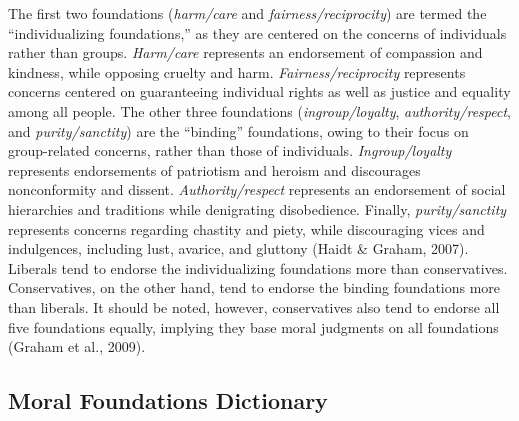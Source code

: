\documentclass[,man]{apa6}
\begin{document}
The first two foundations (\emph{harm/care} and
\emph{fairness/reciprocity}) are termed the \enquote{individualizing
foundations,} as they are centered on the concerns of individuals rather
than groups. \emph{Harm/care} represents an endorsement of compassion
and kindness, while opposing cruelty and harm.
\emph{Fairness/reciprocity} represents concerns centered on guaranteeing
individual rights as well as justice and equality among all people. The
other three foundations (\emph{ingroup/loyalty},
\emph{authority/respect}, and \emph{purity/sanctity}) are the
\enquote{binding} foundations, owing to their focus on group-related
concerns, rather than those of individuals. \emph{Ingroup/loyalty}
represents endorsements of patriotism and heroism and discourages
nonconformity and dissent. \emph{Authority/respect} represents an
endorsement of social hierarchies and traditions while denigrating
disobedience. Finally, \emph{purity/sanctity} represents concerns
regarding chastity and piety, while discouraging vices and indulgences,
including lust, avarice, and gluttony (Haidt \& Graham, 2007). Liberals
tend to endorse the individualizing foundations more than conservatives.
Conservatives, on the other hand, tend to endorse the binding
foundations more than liberals. It should be noted, however,
conservatives also tend to endorse all five foundations equally,
implying they base moral judgments on all foundations (Graham et al.,
2009).

\subsection{Moral Foundations
Dictionary}\label{moral-foundations-dictionary}
\end{document}
